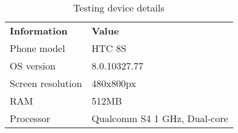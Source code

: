 \begin{table}[htbp]
  \centering
  \caption{Testing device details}
  \label{tab:htc}
 \renewcommand{\arraystretch}{1.2}
    \begin{tabularx}{\textwidth}{p{3cm}|X}
    \rowcolor{mygray}
    \textbf{Information} & \textbf{Value} \\
       Phone model & HTC 8S \\ \hline
       OS version & 8.0.10327.77 \\ \hline
       Screen resolution & 480x800px \\ \hline
       RAM & 512MB \\ \hline
		Processor & Qualcomm S4 1 GHz, Dual-core \\
    \end{tabularx}%
\end{table}%